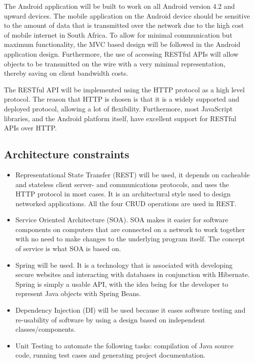\documentclass[a4paper,10pt]{article}
\begin{document}
The Android application will be built to work on all Android version 4.2 and upward devices. The mobile application on the Android device should be sensitive to the amount of data that is transmitted over the network due to the high cost of mobile internet in South Africa. To allow for minimal communication but maximum functionality, the MVC based design will be followed in the Android application design.  Furthermore, the use of accessing RESTful APIs will allow objects to be transmitted on the wire with a very minimal representation, thereby saving on client bandwidth costs.

The RESTful API will be implemented using the HTTP protocol as a high level protocol. The reason that HTTP is chosen is that it is a widely supported and deployed protocol, allowing a lot of flexibility. Furthermore, most JavaScript libraries, and the Android platform itself, have excellent support for RESTful APIs over HTTP.

\subsection{Architecture constraints}
\begin{itemize}
\item Representational State Transfer (REST) will be used, it depends on cacheable and stateless client server- and communications protocols, and uses the HTTP protocol in most cases. It is an architectural style used to design networked applications. All the four CRUD operations are used in REST. 
\item Service Oriented Architecture (SOA). SOA makes it easier for software components on computers that are connected on a network to work together with no need to make changes to the underlying program itself. The concept of service is what SOA is based on.
\item Spring will be used. It is a technology that is associated with developing secure websites and interacting with databases in conjunction with Hibernate. Spring is simply a usable API, with the idea being for the developer to represent Java objects with Spring Beans.
\item Dependency Injection (DI) will be used because it eases software testing and re-usability of software by using a design based on independent classes/components.
\item Unit Testing to automate the following tasks: compilation of Java source code, running test cases and generating project documentation.
\end{itemize}
\end{document}
